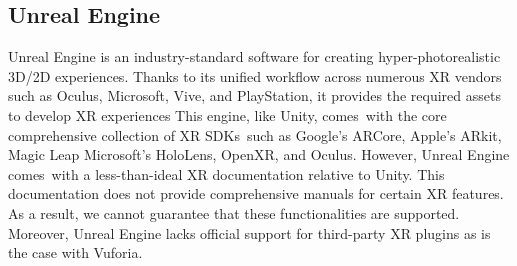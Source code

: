 \documentclass{vgtc}                          %
\begin{document}
\subsection{Unreal Engine}
Unreal Engine is an industry-standard software for creating
hyper-photorealistic 3D/2D experiences. Thanks to its unified workflow across
numerous XR vendors such as Oculus, Microsoft, Vive, and PlayStation, it
provides the required assets to develop XR experiences This engine, like Unity,
comes with the core comprehensive collection of XR SDKs such as Google's
ARCore, Apple's ARkit, Magic Leap Microsoft's HoloLens, OpenXR, and Oculus.
However, Unreal Engine comes with a  less-than-ideal XR documentation relative
to Unity. This documentation does not provide comprehensive manuals for certain
XR features. As a result, we cannot guarantee that these functionalities are
supported. Moreover, Unreal Engine lacks official support for third-party XR
plugins as is the case with Vuforia.
\end{document}

